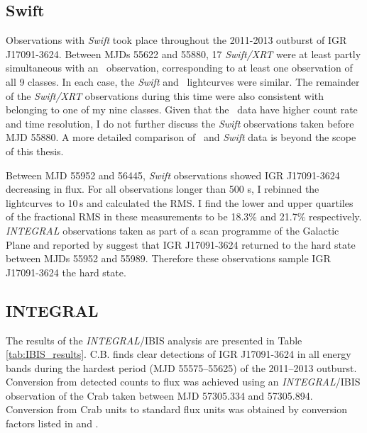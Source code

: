 \subsection{Swift}

\par Observations with \textit{Swift} took place throughout the 2011-2013 outburst of IGR J17091-3624.  Between MJDs 55622 and 55880, 17 \textit{Swift/XRT} were at least partly simultaneous with an \rxte\ observation, corresponding to at least one observation of all 9 classes.  In each case, the \textit{Swift} and \rxte\ lightcurves were similar.  The remainder of the \textit{Swift/XRT} observations during this time were also consistent with belonging to one of my nine classes.  Given that the \rxte\ data have higher count rate and time resolution, I do not further discuss the \textit{Swift} observations taken before MJD 55880.  A more detailed comparison of \rxte\ and \textit{Swift} data is beyond the scope of this thesis.
\par Between MJD 55952 and 56445, \textit{Swift} observations showed IGR J17091-3624 decreasing in flux.  For all observations longer than 500 s, I rebinned the lightcurves to 10\,s and calculated the RMS.  I find the lower and upper quartiles of the fractional RMS in these measurements to be 18.3\% and 21.7\% respectively.  \textit{INTEGRAL} observations taken as part of a scan programme of the Galactic Plane \citep{Fiocchi_PlaneScan} and reported by \citet{Drave_Return} suggest that IGR J17091-3624 returned to the hard state between MJDs 55952 and 55989.  Therefore these observations sample IGR J17091-3624 the hard state.

\subsection{INTEGRAL}

\par The results of the \textit{INTEGRAL}/IBIS analysis are presented in Table \ref{tab:IBIS_results}. \textsf{C.B.} finds clear detections of IGR J17091-3624 in all energy bands during the hardest period (MJD 55575--55625) of the 2011--2013 outburst. Conversion from detected counts to flux was achieved using an \textit{INTEGRAL}/IBIS observation of the Crab taken between MJD 57305.334 and 57305.894. Conversion from Crab units to standard flux units was obtained by conversion factors listed in \citet{Bird_Survey} and \citet{Bazzano_Survey}.

